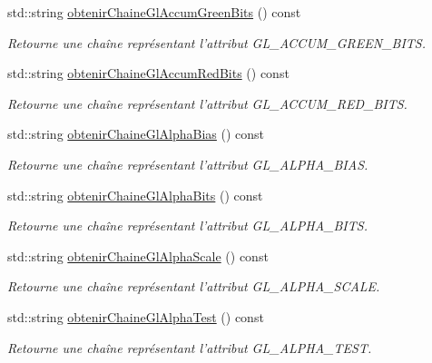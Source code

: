 \begin{DoxyCompactItemize}
std\-::string \hyperlink{group__utilitaire_gae677b60d2113b1843ba4d2c92fe34c34}{obtenir\-Chaine\-Gl\-Accum\-Green\-Bits} () const 
\begin{DoxyCompactList}\small\item\em Retourne une chaîne représentant l'attribut G\-L\-\_\-\-A\-C\-C\-U\-M\-\_\-\-G\-R\-E\-E\-N\-\_\-\-B\-I\-T\-S. \end{DoxyCompactList}\item 
std\-::string \hyperlink{group__utilitaire_ga3405a98de14c30d7a57d954d298b6376}{obtenir\-Chaine\-Gl\-Accum\-Red\-Bits} () const 
\begin{DoxyCompactList}\small\item\em Retourne une chaîne représentant l'attribut G\-L\-\_\-\-A\-C\-C\-U\-M\-\_\-\-R\-E\-D\-\_\-\-B\-I\-T\-S. \end{DoxyCompactList}\item 
std\-::string \hyperlink{group__utilitaire_gaf54d9525863334d2d2fd362c7043a4be}{obtenir\-Chaine\-Gl\-Alpha\-Bias} () const 
\begin{DoxyCompactList}\small\item\em Retourne une chaîne représentant l'attribut G\-L\-\_\-\-A\-L\-P\-H\-A\-\_\-\-B\-I\-A\-S. \end{DoxyCompactList}\item 
std\-::string \hyperlink{group__utilitaire_ga7ea311e8cfd6aee3cb19e2041b2ba132}{obtenir\-Chaine\-Gl\-Alpha\-Bits} () const 
\begin{DoxyCompactList}\small\item\em Retourne une chaîne représentant l'attribut G\-L\-\_\-\-A\-L\-P\-H\-A\-\_\-\-B\-I\-T\-S. \end{DoxyCompactList}\item 
std\-::string \hyperlink{group__utilitaire_ga3b85b93cd7e5d1f12a225f28ece00696}{obtenir\-Chaine\-Gl\-Alpha\-Scale} () const 
\begin{DoxyCompactList}\small\item\em Retourne une chaîne représentant l'attribut G\-L\-\_\-\-A\-L\-P\-H\-A\-\_\-\-S\-C\-A\-L\-E. \end{DoxyCompactList}\item 
std\-::string \hyperlink{group__utilitaire_ga9fd2e2270997cf027e38f6a7b8d621a8}{obtenir\-Chaine\-Gl\-Alpha\-Test} () const 
\begin{DoxyCompactList}\small\item\em Retourne une chaîne représentant l'attribut G\-L\-\_\-\-A\-L\-P\-H\-A\-\_\-\-T\-E\-S\-T. \end{DoxyCompactList}\item 

\end{DoxyCompactItemize}
